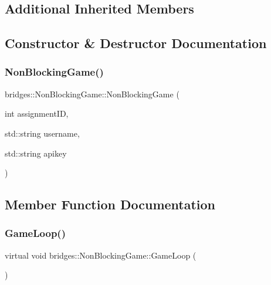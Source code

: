\subsection*{Additional Inherited Members}


\subsection{Constructor \& Destructor Documentation}
\mbox{\label{classbridges_1_1_non_blocking_game_acf06923b682ad989fb8a8b5ed501f8d6}} 
\subsubsection{\texorpdfstring{NonBlockingGame()}{NonBlockingGame()}}
{\footnotesize\ttfamily bridges\+::\+Non\+Blocking\+Game\+::\+Non\+Blocking\+Game (\begin{DoxyParamCaption}\item[{int}]{assignment\+ID,  }\item[{std\+::string}]{username,  }\item[{std\+::string}]{apikey }\end{DoxyParamCaption})\hspace{0.3cm}{\ttfamily [inline]}}



\subsection{Member Function Documentation}
\mbox{\label{classbridges_1_1_non_blocking_game_a295adb09973c371cb9821def97a6a416}} 
\subsubsection{\texorpdfstring{GameLoop()}{GameLoop()}}
{\footnotesize\ttfamily virtual void bridges\+::\+Non\+Blocking\+Game\+::\+Game\+Loop (\begin{DoxyParamCaption}{ }\end{DoxyParamCaption})\hspace{0.3cm}{\ttfamily [pure virtual]}}

